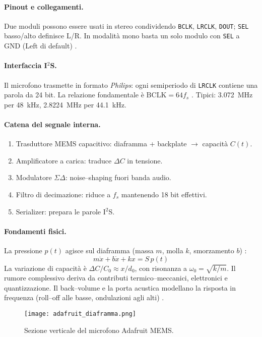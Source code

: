 \paragraph{Pinout e collegamenti.} 
Due moduli possono essere usati in stereo condividendo \texttt{BCLK}, \texttt{LRCLK}, \texttt{DOUT}; \texttt{SEL} basso/alto definisce L/R. 
In modalità mono basta un solo modulo con \texttt{SEL} a GND (Left di default) \citep{adafruit-guide}.

\paragraph{Interfaccia I$^2$S.} 
Il microfono trasmette in formato \emph{Philips}: ogni semiperiodo di \texttt{LRCLK} contiene una parola da 24 bit. 
La relazione fondamentale è $\mathrm{BCLK}=64f_s$ \citep{nordic-devzone}. 
Tipici: \SI{3.072}{MHz} per \SI{48}{kHz}, \SI{2.8224}{MHz} per \SI{44.1}{kHz}.

\paragraph{Catena del segnale interna.}
\begin{enumerate}
  \item Trasduttore MEMS capacitivo: diaframma + backplate $\to$ capacità $C(t)$.
  \item Amplificatore a carica: traduce $\Delta C$ in tensione.
  \item Modulatore $\Sigma\Delta$: noise–shaping fuori banda audio.
  \item Filtro di decimazione: riduce a $f_s$ mantenendo 18 bit effettivi.
  \item Serializer: prepara le parole I$^2$S.
\end{enumerate}

\paragraph{Fondamenti fisici.}
La pressione $p(t)$ agisce sul diaframma (massa $m$, molla $k$, smorzamento $b$) \citep{mems-acoustics}:
\[
m\ddot{x}+b\dot{x}+kx=S\,p(t)
\]
La variazione di capacità è $\Delta C/C_0 \approx x/d_0$, con risonanza a $\omega_0=\sqrt{k/m}$. 
Il rumore complessivo deriva da contributi termico–meccanici, elettronici e quantizzazione. 
Il back–volume e la porta acustica modellano la risposta in frequenza (roll–off alle basse, ondulazioni agli alti) \citep{mems-acoustics}.
\begin{figure}[H]
  \centering
  \texttt{[image: adafruit\_diaframma.png]}
  \caption{Sezione verticale del microfono Adafruit MEMS.}
  \label{fig:adafruit_diaframma}
  \end{figure}

